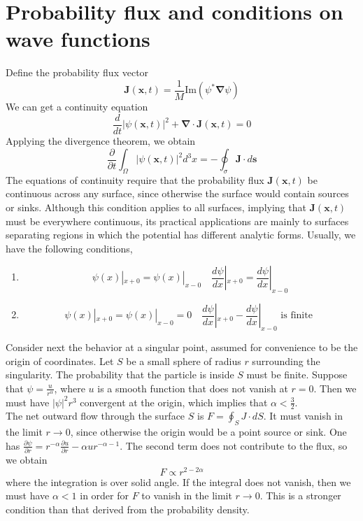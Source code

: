 \documentclass[cyan]{elegantnote}
\begin{document}
\section{Probability flux and conditions on wave functions}
\noindent
Define the probability flux vector
\[\bm{J}(\bm{x},t) = \frac{1}{M} \mathrm{Im}(\psi^*\bm{\nabla}\psi)\]
We can get a continuity equation
\[\frac{d}{dt} |\psi(\bm{x},t)|^2 + \bm{\nabla} \cdot \bm{J}(\bm{x},t) = 0\]
Applying the divergence theorem, we obtain
\[\frac{\partial}{\partial t} \int_{\Omega} |\psi(\bm{x},t)|^2 d^3x = - \oint_{\sigma} \bm{J} \cdot d\bm{s}\]
The equations of continuity require that the probability
flux $\bm{J}(\bm{x},t)$ be continuous across any surface, since otherwise the surface would contain sources or sinks. Although this condition applies to all surfaces, implying that $\bm{J}(\bm{x},t)$ must be everywhere continuous, its practical applications are mainly to surfaces separating regions in which the potential has different analytic forms.
Usually, we have the following conditions,
\begin{enumerate}
\item \[\psi(x)|_{x+0} = \psi(x)|_{x-0} \quad \frac{d\psi}{dx}|_{x+0} = \frac{d\psi}{dx}|_{x-0}\]
\item \[\psi(x)|_{x+0} = \psi(x)|_{x-0} = 0 \quad \frac{d\psi}{dx}|_{x+0} - \frac{d\psi}{dx}|_{x-0} \mbox{ is finite }\]
\end{enumerate}
\noindent
Consider next the behavior at a singular point, assumed for convenience to be the origin of coordinates. Let $S$ be a small sphere of radius $r$ surrounding the singularity. The probability that the particle is inside $S$ must be finite.
Suppose that $\psi = \frac{u}{r^{\alpha}}$, where $u$ is a smooth function that does not vanish at $r=0$. Then we must have $|\psi|^2 r^3$ convergent at the origin, which implies that $\alpha < \frac{3}{2}$.\\
The net outward flow through the surface $S$ is $F = \oint_{S} J \cdot dS$. It must vanish in the limit $r \to 0$, since otherwise the origin would be a point source or sink.
One has $\frac{\partial \psi}{\partial r} = r^{-\alpha} \frac{\partial u}{\partial r} - \alpha u r^{-\alpha-1}$. The second term does not contribute to the flux, so we obtain
\[F \propto r^{2-2\alpha}\]
where the integration is over solid angle. If the integral does not vanish, then we must have $\alpha <1$ in order for $F$ to vanish in the limit $r \to 0$. This is a stronger condition than that derived from the probability density. \\
\end{document}
